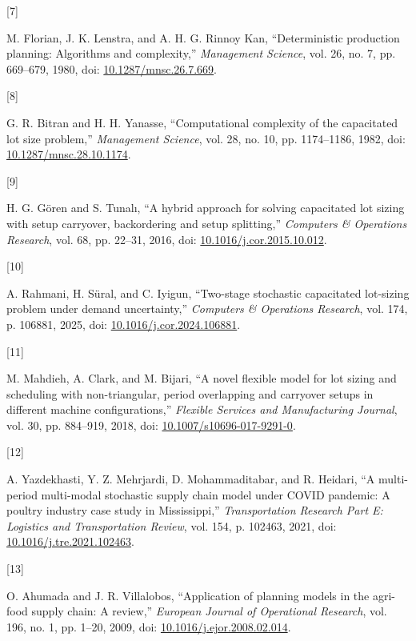 \documentclass[
  spanish,
  12pt,
]{article}
\newlength{\cslhangindent}
\newlength{\csllabelwidth}
\newenvironment{CSLReferences}[2] %
 {\begin{list}{}{%
  \setlength{\itemindent}{0pt}
  \setlength{\leftmargin}{0pt}
  \setlength{\parsep}{0pt}
  \ifodd #1
   \setlength{\leftmargin}{\cslhangindent}
   \setlength{\itemindent}{-1\cslhangindent}
  \fi
  \setlength{\itemsep}{#2\baselineskip}}}
 {\end{list}}
\newcommand{\CSLLeftMargin}[1]{\parbox[t]{\csllabelwidth}{\strut#1\strut}}
\newcommand{\CSLRightInline}[1]{\parbox[t]{\linewidth - \csllabelwidth}{\strut#1\strut}}
\begin{document}
\begin{CSLReferences}{0}{0}
\CSLLeftMargin{{[}7{]} }%
\CSLRightInline{M. Florian, J. K. Lenstra, and A. H. G. Rinnoy Kan,
{``Deterministic production planning: Algorithms and complexity,''}
\emph{Management Science}, vol. 26, no. 7, pp. 669--679, 1980, doi:
\href{https://doi.org/10.1287/mnsc.26.7.669}{10.1287/mnsc.26.7.669}.}

\CSLLeftMargin{{[}8{]} }%
\CSLRightInline{G. R. Bitran and H. H. Yanasse, {``Computational
complexity of the capacitated lot size problem,''} \emph{Management
Science}, vol. 28, no. 10, pp. 1174--1186, 1982, doi:
\href{https://doi.org/10.1287/mnsc.28.10.1174}{10.1287/mnsc.28.10.1174}.}

\CSLLeftMargin{{[}9{]} }%
\CSLRightInline{H. G. Gören and S. Tunalı, {``A hybrid approach for
solving capacitated lot sizing with setup carryover, backordering and
setup splitting,''} \emph{Computers \& Operations Research}, vol. 68,
pp. 22--31, 2016, doi:
\href{https://doi.org/10.1016/j.cor.2015.10.012}{10.1016/j.cor.2015.10.012}.}

\CSLLeftMargin{{[}10{]} }%
\CSLRightInline{A. Rahmani, H. Süral, and C. Iyigun, {``Two-stage
stochastic capacitated lot-sizing problem under demand uncertainty,''}
\emph{Computers \& Operations Research}, vol. 174, p. 106881, 2025, doi:
\href{https://doi.org/10.1016/j.cor.2024.106881}{10.1016/j.cor.2024.106881}.}

\CSLLeftMargin{{[}11{]} }%
\CSLRightInline{M. Mahdieh, A. Clark, and M. Bijari, {``A novel flexible
model for lot sizing and scheduling with non-triangular, period
overlapping and carryover setups in different machine configurations,''}
\emph{Flexible Services and Manufacturing Journal}, vol. 30, pp.
884--919, 2018, doi:
\href{https://doi.org/10.1007/s10696-017-9291-0}{10.1007/s10696-017-9291-0}.}

\CSLLeftMargin{{[}12{]} }%
\CSLRightInline{A. Yazdekhasti, Y. Z. Mehrjardi, D. Mohammaditabar, and
R. Heidari, {``A multi-period multi-modal stochastic supply chain model
under {COVID} pandemic: A poultry industry case study in
{Mississippi},''} \emph{Transportation Research Part E: Logistics and
Transportation Review}, vol. 154, p. 102463, 2021, doi:
\href{https://doi.org/10.1016/j.tre.2021.102463}{10.1016/j.tre.2021.102463}.}

\CSLLeftMargin{{[}13{]} }%
\CSLRightInline{O. Ahumada and J. R. Villalobos, {``Application of
planning models in the agri-food supply chain: A review,''}
\emph{European Journal of Operational Research}, vol. 196, no. 1, pp.
1--20, 2009, doi:
\href{https://doi.org/10.1016/j.ejor.2008.02.014}{10.1016/j.ejor.2008.02.014}.}


\end{CSLReferences}
\end{document}
